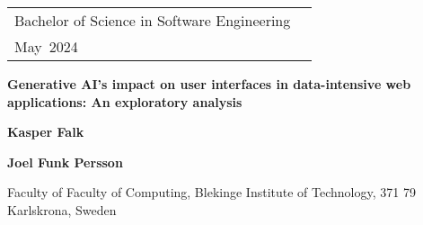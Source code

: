 \documentclass[a4paper,twoside]{bth}
\newcommand{\thesisDegree}{Bachelor of Science in Software Engineering}
\newcommand{\thesisMonth}{May}
\newcommand{\thesisYear}{2024}
\newcommand{\faculty}{Faculty of Computing}
\newcommand{\thesisTitle}{Generative AI’s impact on user interfaces in data-intensive web applications: An exploratory analysis}
\newcommand{\authorFirst}{Kasper Falk}
\newcommand{\authorSecond}{Joel Funk Persson}
\begin{document}
\pagestyle{plain}

{\pagestyle{empty}
\changepage{3cm}{1cm}{-0.5cm}{-0.5cm}{}{-1.5cm}{}{}{}
\noindent
\begin{tabular}{@{}p{} p{}}
\thesisDegree & \hfill\multirow{3}{*}{\bthcsnotextlogo{3cm}} \\
\thesisMonth \ \thesisYear & \\
\end{tabular}

\center
\vspace {7.5cm}
{\Huge\textbf{\thesisTitle}}


\vspace{2cm}
{\Large\textbf{\authorFirst}}

\vspace{0.3cm}
{\Large\textbf{\authorSecond}}

\vspace*{\fill}

\noindent\makebox[\linewidth]{\rule{\textwidth}{1pt}} 
Faculty of \faculty, Blekinge Institute of Technology, 371 79 Karlskrona, Sweden

\clearpage
} %
\end{document}

